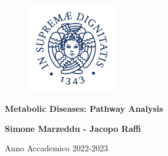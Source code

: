 \begin{titlepage}
\begin{center}
    \begin{figure}
        \centering
        \includegraphics[width=0.35\textwidth]{Images/logo.jpg}
    \end{figure}

\vskip 2cm
\begin{LARGE}
{\bf Metabolic Diseases: Pathway Analysis}
\\[3mm]
\end{LARGE}
\vskip 2cm
\bf{Simone Marzeddu - Jacopo Raffi}

\vskip 2cm

\begin{large}
Anno Accademico 2022-2023
\end{large}

\end{center}
\end{titlepage}